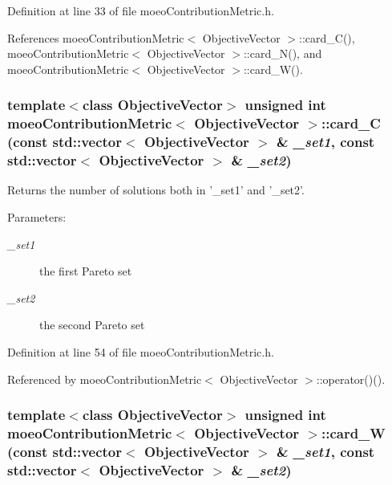 Definition at line 33 of file moeo\-Contribution\-Metric.h.

References moeo\-Contribution\-Metric$<$ Objective\-Vector $>$::card\_\-C(), moeo\-Contribution\-Metric$<$ Objective\-Vector $>$::card\_\-N(), and moeo\-Contribution\-Metric$<$ Objective\-Vector $>$::card\_\-W().
\subsubsection{\setlength{\rightskip}{0pt plus 5cm}template$<$class Objective\-Vector$>$ unsigned int \bf{moeo\-Contribution\-Metric}$<$ Objective\-Vector $>$::card\_\-C (const std::vector$<$ Objective\-Vector $>$ \& {\em \_\-set1}, const std::vector$<$ Objective\-Vector $>$ \& {\em \_\-set2})\hspace{0.3cm}{\tt  [inline, private]}}\label{classmoeoContributionMetric_4e60849763aaad0cdea66e71edf2d29e}


Returns the number of solutions both in '\_\-set1' and '\_\-set2'. 

\begin{Desc}
\item[Parameters:]
\begin{description}
\item[{\em \_\-set1}]the first Pareto set \item[{\em \_\-set2}]the second Pareto set \end{description}
\end{Desc}


Definition at line 54 of file moeo\-Contribution\-Metric.h.

Referenced by moeo\-Contribution\-Metric$<$ Objective\-Vector $>$::operator()().
\subsubsection{\setlength{\rightskip}{0pt plus 5cm}template$<$class Objective\-Vector$>$ unsigned int \bf{moeo\-Contribution\-Metric}$<$ Objective\-Vector $>$::card\_\-W (const std::vector$<$ Objective\-Vector $>$ \& {\em \_\-set1}, const std::vector$<$ Objective\-Vector $>$ \& {\em \_\-set2})\hspace{0.3cm}{\tt  [inline, private]}}\label{classmoeoContributionMetric_68d6d1ec1ed0bed1ea290cdacb93b5b2}


